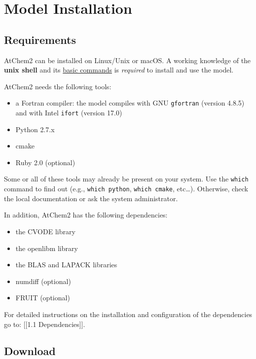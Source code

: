 \chapter{Model Installation} \label{ch:installation}

\section{Requirements} \label{sec:requirements}

AtChem2 can be installed on Linux/Unix or macOS. A working knowledge
of the \textbf{unix shell} and its
\href{https://swcarpentry.github.io/shell-novice/reference/}{basic
  commands} is \emph{required} to install and use the model.

AtChem2 needs the following tools:

\begin{itemize}
\item a Fortran compiler: the model compiles with GNU
  \texttt{gfortran} (version 4.8.5) and with Intel \texttt{ifort}
  (version 17.0)
\item Python 2.7.x
\item cmake
\item Ruby 2.0 (optional)
\end{itemize}

Some or all of these tools may already be present on your system. Use
the \texttt{which} command to find out (e.g., \texttt{which\ python},
\texttt{which\ cmake}, etc\ldots{}). Otherwise, check the local
documentation or ask the system administrator.

In addition, AtChem2 has the following dependencies:

\begin{itemize}
\item the CVODE library
\item the openlibm library
\item the BLAS and LAPACK libraries
\item numdiff (optional)
\item FRUIT (optional)
\end{itemize}

For detailed instructions on the installation and configuration of the
dependencies go to: {[}{[}1.1 Dependencies{]}{]}.

\section{Download} \label{sec:download}

